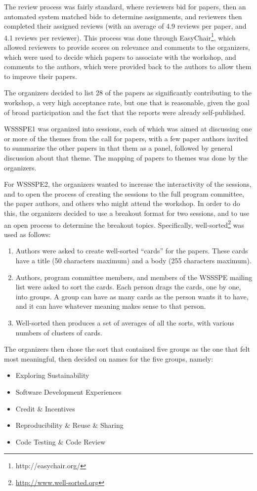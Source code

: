 \documentclass[11pt, oneside]{amsart}
\begin{document}
The review process was fairly standard, where reviewers bid for papers, then an
automated system
matched bids to determine assignments, and reviewers then completed their
assigned
reviews (with an average of 4.9 reviews per paper, and 4.1 reviews per
reviewer).
This process was done through EasyChair\footnote{http://easychair.org/}, which
allowed reviewers to provide scores on relevance and comments to the organizers,
which were used to decide which papers to associate with the workshop, and
comments to the authors, which were provided back to the authors to allow them
to improve their papers.

The organizers decided to list 28 of the papers as significantly contributing to
the workshop, a very high acceptance rate, but one that is reasonable, given the
goal of broad participation and the fact that the reports were already
self-published.

WSSSPE1 was organized into sessions, each of which was aimed at discussing one
or more of the themes from the call for papers, with a few paper authors invited
to summarize the other papers in that them as a panel, followed by general
discussion about that theme. The mapping of papers to themes was done by the
organizers.

For WSSSPE2, the organizers wanted to increase the interactivity of the
sessions, and to open the process of creating the sessions to the full program
committee, the paper authors, and others who might attend the workshop. In order
to do this, the organizers decided to use a breakout format for two sessions,
and to use an open process to determine the breakout topics. Specifically,
well-sorted\footnote{\url{http://www.well-sorted.org}} was used as follows:
\begin{enumerate}
\item Authors were asked to create well-sorted ``cards'' for the papers. These
cards have a title (50 characters maximum) and a body (255 characters maximum).
\item Authors, program committee members, and members of the WSSSPE mailing list
were asked to sort the cards. Each person drags the cards, one by one, into
groups. A group can have as many cards as the person wants it to have, and it
can have whatever meaning makes sense to that person.
\item Well-sorted then produces a set of averages of all the sorts, with various
numbers of clusters of cards.
\end{enumerate}

The organizers then chose the sort that contained five groups as the one that
felt most meaningful, then decided on names for the five groups, namely:
\begin{itemize}
\item Exploring Sustainability
\item Software Development Experiences
\item Credit \& Incentives
\item Reproducibility \& Reuse \& Sharing
\item Code Testing \& Code Review
\end{itemize}
\end{document}
